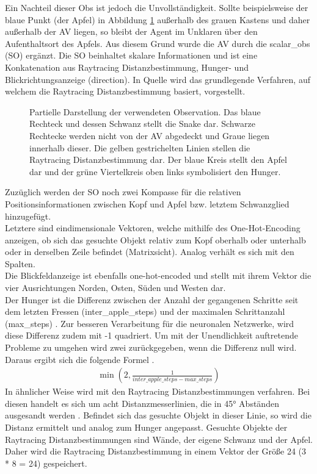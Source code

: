 Ein Nachteil dieser Obs ist jedoch die Unvollständigkeit. Sollte beispielsweise der blaue Punkt (der Apfel) in Abbildung \ref{fig:Konzept_Observation} außerhalb des grauen Kastens und daher außerhalb der AV liegen, so bleibt der Agent im Unklaren über den Aufenthaltsort des Apfels.
Aus diesem Grund wurde die AV durch die scalar\_obs (SO) ergänzt. Die SO beinhaltet skalare Informationen und ist eine Konkatenation aus Raytracing Distanzbestimmung, Hunger- und Blickrichtungsanzeige (direction).
In Quelle \citep{Glassner1989} wird das grundlegende Verfahren, auf welchem die Raytracing Distanzbestimmung basiert, vorgestellt. 
\begin{figure}[H]
	\centering
	
	\caption[Observation]{Partielle Darstellung der verwendeten Observation. Das blaue Rechteck und dessen Schwanz stellt die Snake dar. Schwarze Rechtecke werden nicht von der AV abgedeckt und Graue liegen innerhalb dieser. Die gelben gestrichelten Linien stellen die Raytracing Distanzbestimmung dar. Der blaue Kreis stellt den Apfel dar und der grüne Viertelkreis oben links symbolisiert den Hunger.}
	\label{fig:Konzept_Observation}
\end{figure}
Zuzüglich werden der SO noch zwei Kompasse für die relativen Positionsinformationen zwischen Kopf und Apfel bzw. letztem Schwanzglied hinzugefügt.\\
Letztere sind eindimensionale Vektoren, welche mithilfe des One-Hot-Encoding anzeigen, ob sich das gesuchte Objekt relativ zum Kopf oberhalb oder unterhalb oder in derselben Zeile befindet (Matrixsicht). Analog verhält es sich mit den Spalten.\\
Die Blickfeldanzeige ist ebenfalls one-hot-encoded und stellt mit ihrem Vektor die vier Ausrichtungen Norden, Osten, Süden und Westen dar.\\
Der Hunger ist die Differenz zwischen der Anzahl der gegangenen Schritte seit dem letzten Fressen (inter\_apple\_steps) und der maximalen Schrittanzahl (max\_steps) . Zur besseren Verarbeitung für die neuronalen Netzwerke, wird diese Differenz zudem mit -1 quadriert. 
Um mit der Unendlichkeit auftretende Probleme zu umgehen wird zwei zurückgegeben, wenn die Differenz null wird.
Daraus ergibt sich die folgende Formel .
\begin{align}
	\min(2, \frac{1}{inter\_apple\_steps - max\_steps})
	\label{eq:Konzept_Hunger}
\end{align}
In ähnlicher Weise wird mit den Raytracing Distanzbestimmungen verfahren. Bei diesen handelt es sich um acht Distanzmesserlinien, die in 45° Abständen ausgesandt werden . Befindet sich das gesuchte Objekt in dieser Linie, so wird die Distanz ermittelt und analog zum Hunger angepasst. Gesuchte Objekte der Raytracing Distanzbestimmungen sind Wände, der eigene Schwanz und der Apfel. Daher wird die Raytracing Distanzbestimmung in einem Vektor der Größe 24 (3 * 8 = 24) gespeichert.

